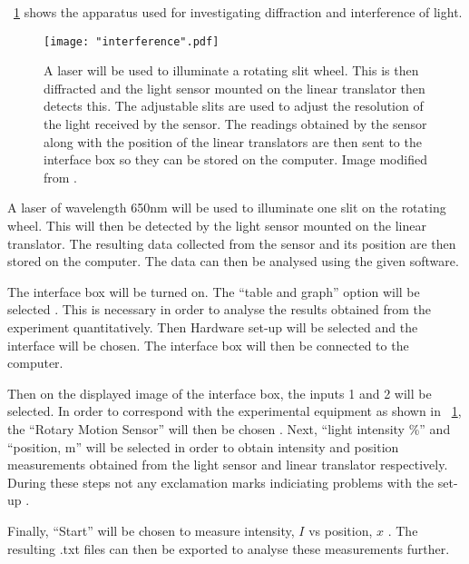 \documentclass{article}
\newcommand{\figref}[2][\figurename~]{#1\ref{#2}}
\begin{document}
\figref{fig:interference} shows the apparatus used for investigating diffraction and interference of light.

\begin{figure}[h]
\centering
\texttt{[image: "interference".pdf]}
\caption{A laser will be used to illuminate a rotating slit wheel. This is then diffracted and the light sensor mounted on the linear translator then detects this. The adjustable slits are used to adjust the resolution of the light received by the sensor. The readings obtained by the sensor along with the position of the linear translators are then sent to the interface box so they can be stored on the computer. Image modified from \cite{Paper02}.}
\label{fig:interference}
\end{figure}

\vspace{2mm}
\noindent
A laser of wavelength 650nm will be used to illuminate one slit on the rotating wheel. This will then be detected by the light sensor mounted on the linear translator. The resulting data collected from the sensor and its position are then stored on the computer. The data can then be analysed using the given software. 

\vspace{2mm}
\noindent
The interface box will be turned on. The ``table and graph'' option will be selected \cite{Paper02}. This is necessary in order to analyse the results obtained from the experiment quantitatively. Then Hardware set-up will be selected and the interface will be chosen. The interface box will then be connected to the computer.

\vspace{2mm}
\noindent
Then on the displayed image of the interface box, the inputs 1 and 2 will be selected. In order to correspond with the experimental equipment as shown in \figref{fig:interference}, the ``Rotary Motion Sensor'' will then be chosen \cite{Paper02}. Next, ``light intensity \%'' and ``position, m'' \cite{Paper02} will be selected in order to obtain intensity and position measurements obtained from the light sensor and linear translator respectively. During these steps not any exclamation marks indiciating problems with the set-up \cite{Paper02}.

\vspace{2mm}
\noindent
Finally, ``Start'' will be chosen to measure intensity, $I$ vs position, $x$ \cite{Paper02}. The resulting .txt files can then be exported to analyse these measurements further. 
\end{document}
